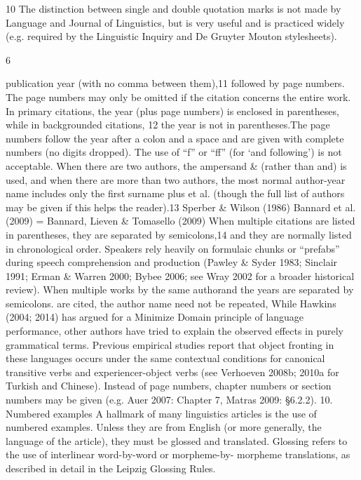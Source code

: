  	
 	
 	
 	
 	
 	
 	
 	
 	
 	
 	
 	
 	
 	
 	
 	
 	
 	
 	
 	
 	
 	
 	
	
  
10
 The distinction between single and double quotation marks is not made by Language and Journal of
Linguistics, but is very useful and is practiced widely (e.g. required by the Linguistic Inquiry and De Gruyter
Mouton stylesheets).
	
 
 6	
  
publication year (with no comma between them),11 followed by page numbers. The page
numbers may only be omitted if the citation concerns the entire work. In primary citations,
the year (plus page numbers) is enclosed in parentheses, while in backgrounded citations,
12
the year is not in parentheses.The page numbers follow the year after a colon and a space and are given with complete
numbers (no digits dropped). The use of “f” or “ff” (for ‘and following’) is not acceptable.
When there are two authors, the ampersand \& (rather than and) is used, and when
there are more than two authors, the most normal author-year name includes only the first
surname plus et al. (though the full list of authors may be given if this helps the reader).13
Sperber \& Wilson (1986)
Bannard et al. (2009)
= Bannard, Lieven \& Tomasello (2009)
When multiple citations are listed in parentheses, they are separated by semicolons,14 and
they are normally listed in chronological order.
Speakers rely heavily on formulaic chunks or “prefabs” during speech comprehension and production
(Pawley \& Syder 1983; Sinclair 1991; Erman \& Warren 2000; Bybee 2006; see Wray 2002 for a
broader historical review).
When multiple works by the same authorand the years are separated by semicolons.
are cited, the author name need not be repeated,
While Hawkins (2004; 2014) has argued for a Minimize Domain principle of language performance,
other authors have tried to explain the observed effects in purely grammatical terms.
Previous empirical studies report that object fronting in these languages occurs under the same
contextual conditions for canonical transitive verbs and experiencer-object verbs (see Verhoeven 2008b;
2010a for Turkish and Chinese).
Instead of page numbers, chapter numbers or section numbers may be given (e.g. Auer
2007: Chapter 7, Matras 2009: §6.2.2).
10. Numbered examples
A hallmark of many linguistics articles is the use of numbered examples. Unless they are
from English (or more generally, the language of the article), they must be glossed and
translated. Glossing refers to the use of interlinear word-by-word or morpheme-by-
morpheme translations, as described in detail in the Leipzig Glossing Rules.
	
